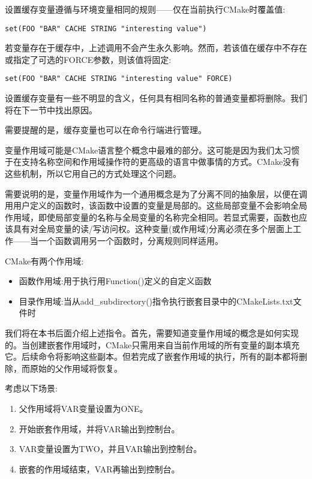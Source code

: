 设置缓存变量遵循与环境变量相同的规则——仅在当前执行CMake时覆盖值:

\begin{lstlisting}[style=styleCMake]
set(FOO "BAR" CACHE STRING "interesting value")
\end{lstlisting}

若变量存在于缓存中，上述调用不会产生永久影响。然而，若该值在缓存中不存在或指定了可选的FORCE参数，则该值将固定:

\begin{lstlisting}[style=styleCMake]
set(FOO "BAR" CACHE STRING "interesting value" FORCE)
\end{lstlisting}

设置缓存变量有一些不明显的含义，任何具有相同名称的普通变量都将删除。我们将在下一节中找出原因。

需要提醒的是，缓存变量也可以在命令行端进行管理。


变量作用域可能是CMake语言整个概念中最难的部分。这可能是因为我们太习惯于在支持名称空间和作用域操作符的更高级的语言中做事情的方式。CMake没有这些机制，所以它用自己的方式处理这个问题。

需要说明的是，变量作用域作为一个通用概念是为了分离不同的抽象层，以便在调用用户定义的函数时，该函数中设置的变量是局部的。这些局部变量不会影响全局作用域，即使局部变量的名称与全局变量的名称完全相同。若显式需要，函数也应该具有对全局变量的读/写访问权。这种变量(或作用域)分离必须在多个层面上工作——当一个函数调用另一个函数时，分离规则同样适用。

CMake有两个作用域:

\begin{itemize}
\item 
函数作用域:用于执行用Function()定义的自定义函数

\item 
目录作用域:当从add\_subdirectory()指令执行嵌套目录中的CMakeLists.txt文件时
\end{itemize}

我们将在本书后面介绍上述指令。首先，需要知道变量作用域的概念是如何实现的。当创建嵌套作用域时，CMake只需用来自当前作用域的所有变量的副本填充它。后续命令将影响这些副本。但若完成了嵌套作用域的执行，所有的副本都将删除，而原始的父作用域将恢复。

考虑以下场景:

\begin{enumerate}
\item 
父作用域将VAR变量设置为ONE。

\item 
开始嵌套作用域，并将VAR输出到控制台。

\item 
VAR变量设置为TWO，并且VAR输出到控制台。

\item 
嵌套的作用域结束，VAR再输出到控制台。
\end{enumerate}


